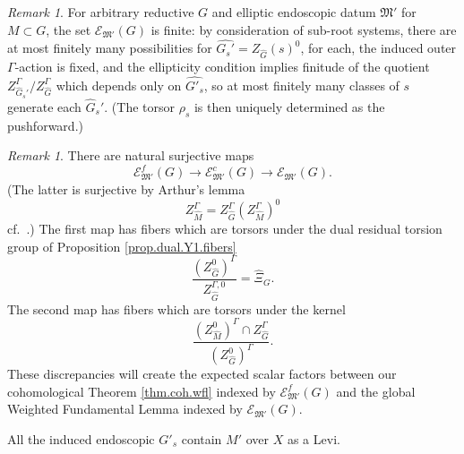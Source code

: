 \documentclass[openany]{amsbook}
\theoremstyle{definition}
\theoremstyle{remark}
\newtheorem{remark}[theorem]{Remark}
\numberwithin{equation}{section}
\newcommand{\cE}{\mathcal{E}}
\renewcommand{\-}{\operatorname{-}}
\newcommand{\fM}{\mathfrak{M}}
\begin{document}
\begin{remark}\label{rmk.ell.end.data.finite}
    For arbitrary reductive $G$ and elliptic endoscopic datum $\fM'$ for $M \subset G$, the set $\cE_{\fM'}(G)$ is finite: by consideration of sub-root systems, there are at most finitely many possibilities for $\widehat{G_s'} = Z_{\widehat{G}}(s)^0$, for each, the induced outer $\Gamma$-action is fixed, and the ellipticity condition implies finitude of the quotient $Z_{\widehat{G}_s'}^\Gamma/Z_{\widehat{G}}^\Gamma$ which depends only on $\widehat{G'_s}$, so at most finitely many classes of $s$ generate each $\widehat{G}_s'$. (The torsor $\rho_s$ is then uniquely determined as the pushforward.)
\end{remark}

\begin{remark}\label{rmk.EMG.vs.EMG0}
    There are natural surjective maps
    $$
        \cE_{\fM'}^f(G) \to \cE_{\fM'}^c(G) \to \cE_{\fM'}(G).
    $$
    (The latter is surjective by Arthur's lemma
    $$
        Z_{\widehat{M}}^\Gamma = Z_{\widehat{G}}^\Gamma (Z_{\widehat{M}}^\Gamma)^0
    $$
    cf.\ \cite[Lemma 1.1]{arthurtransferwoi}.) The first map has fibers which are torsors under the dual residual torsion group of Proposition \ref{prop.dual.Y1.fibers}
    $$
        \frac{(Z_{\widehat{G}}^0)^\Gamma}{Z_{\widehat{G}}^{\Gamma,0}} = \widehat{\Xi}_G.
    $$
    The second map has fibers which are torsors under the kernel
    $$
        \frac{(Z^0_{\widehat{M}})^\Gamma \cap Z_{\widehat{G}}^\Gamma}{(Z_{\widehat{G}}^0)^\Gamma}.
    $$
    These discrepancies will create the expected scalar factors between our cohomological Theorem \ref{thm.coh.wfl} indexed by $\cE^f_{\fM'}(G)$ and the global Weighted Fundamental Lemma indexed by $\cE_{\fM'}(G)$. 
\end{remark}


All the induced endoscopic $G'_s$ contain $M'$ over $X$ as a Levi.
\end{document}
